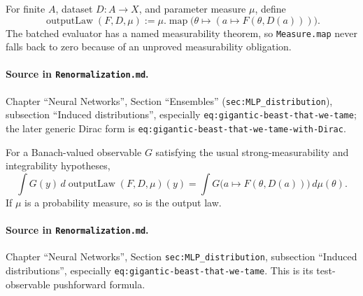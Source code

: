 \begin{definition}
\label{def:renorm:outputLaw}
For finite $A$, dataset $D:A\to X$, and parameter measure $\mu$, define
\[
  \operatorname{outputLaw}(F,D,\mu)
  :=\mu.\operatorname{map}\bigl(\theta\mapsto(a\mapsto F(\theta,D(a)))\bigr).
\]
The batched evaluator has a named measurability theorem, so \texttt{Measure.map} never falls back to
zero because of an unproved measurability obligation.

\paragraph{Source in \texttt{Renormalization.md}.}
Chapter ``Neural Networks'', Section ``Ensembles'' (\texttt{sec:MLP\_distribution}), subsection
``Induced distributions'', especially \texttt{eq:gigantic-beast-that-we-tame}; the later generic
Dirac form is \texttt{eq:gigantic-beast-that-we-tame-with-Dirac}.
\end{definition}

\begin{lemma}
\label{lem:renorm:integralOutputLaw}
For a Banach-valued observable $G$ satisfying the usual strong-measurability and integrability
hypotheses,
\[
 \int G(y)\,d\operatorname{outputLaw}(F,D,\mu)(y)
 =\int G\bigl(a\mapsto F(\theta,D(a))\bigr)\,d\mu(\theta).
\]
If $\mu$ is a probability measure, so is the output law.

\paragraph{Source in \texttt{Renormalization.md}.}
Chapter ``Neural Networks'', Section \texttt{sec:MLP\_distribution}, subsection ``Induced
distributions'', especially \texttt{eq:gigantic-beast-that-we-tame}.  This is its test-observable
pushforward formula.
\end{lemma}

